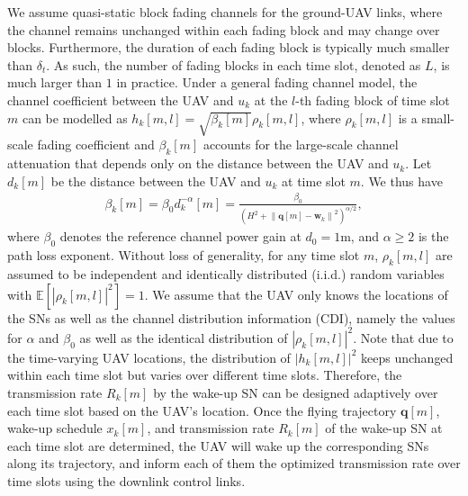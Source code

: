 \documentclass[journal]{IEEEtran}
\newcommand{\norm}[1]{\left\lVert#1\right\rVert}
\begin{document}
We assume quasi-static block fading channels for the ground-UAV links, where the channel remains unchanged within each fading block and may change over blocks. Furthermore, the duration of each fading
block is typically much smaller than $\delta_t$. As such, the number of fading blocks in each time slot, denoted as $L$, is much larger than $1$ in practice. Under a general fading channel model, the channel coefficient between the UAV and $u_k$ at the $l$-th fading block of time slot $m$ can be modelled
as $h_k[m,l]=\sqrt{\beta_k[m]}\rho_k[m,l]$, where $\rho_k[m,l]$ is a small-scale fading coefficient and $\beta_k[m]$ accounts for the large-scale channel attenuation that depends only on the
distance between the UAV and $u_k$. Let $d_k[m]$ be the distance between the UAV and $u_k$ at time slot $m$. We thus have
\begin{eqnarray}
\beta_k[m]=\beta_0d_{k}^{-\alpha}[m]=\frac{\beta_0}{(H^2+\norm{\mathbf{q}[m]-\mathbf{w}_k}^2)^{\alpha/2}},
\end{eqnarray}
where $\beta_0$ denotes the reference channel power gain at $d_0=1$m, and $\alpha\geq 2$ is the
path loss exponent. Without loss of generality, for any time slot $m$, $\rho_k[m,l]$ are assumed to be
independent and identically distributed (i.i.d.) random variables with $\mathbb{E}[|\rho_k[m,l]|^2]=1$. We assume that the UAV only knows the locations of the SNs as well as the channel distribution information (CDI), namely the values for $\alpha$ and $\beta_0$ as well as the identical distribution of $|\rho_k[m,l]|^2$. Note that due to the time-varying UAV locations, the distribution of $|h_k[m,l]|^2$ keeps unchanged within each time slot but varies over different time slots. Therefore, the transmission rate $R_k[m]$ by the wake-up SN can be designed adaptively over each time slot based on the UAV's location. Once the flying trajectory $\mathbf{q}[m]$, wake-up schedule $x_k[m]$, and transmission rate $R_k[m]$ of the wake-up SN at each time slot are determined, the UAV will wake up the corresponding SNs along its trajectory, and inform each of them the optimized transmission rate over time slots using the downlink control links.
\end{document}
